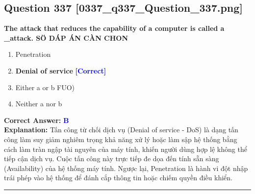 \documentclass[11pt,a4paper]{article}
\begin{document}
\begin{minipage}{\textwidth}
\subsection*{Question 337 \quad \footnotesize{[0337\_q337\_Question\_337.png]}}
\noindent \textbf{The attack that reduces the capability of a computer is called a \_attack. SÖ DÁP ÁN CÀN CHON}

\begin{enumerate}[label=\Alph*.]
    \item Penetration
    \item \textbf{Denial of service} \hfill \textcolor{blue}{\textbf{[Correct]}}
    \item Either a or b FUO)
    \item Neither a nor b
\end{enumerate}

\noindent \textbf{Correct Answer:} \textcolor{blue}{\textbf{B}} \\[2pt]
\noindent \textbf{Explanation:} Tấn công từ chối dịch vụ (Denial of service - DoS) là dạng tấn công làm suy giảm nghiêm trọng khả năng xử lý hoặc làm sập hệ thống bằng cách làm tràn ngập tài nguyên của máy tính, khiến người dùng hợp lệ không thể tiếp cận dịch vụ. Cuộc tấn công này trực tiếp đe dọa đến tính sẵn sàng (Availability) của hệ thống máy tính. Ngược lại, Penetration là hành vi đột nhập trái phép vào hệ thống để đánh cắp thông tin hoặc chiếm quyền điều khiển.

\par\vspace{0.3cm}
\hrule
\vspace{0.3cm}
\end{minipage}
\end{document}
